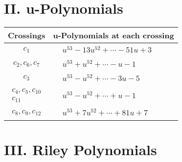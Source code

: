 \documentclass[1p]{elsarticle_modified}
\theoremstyle{definition}
\begin{document}
\newpage\renewcommand{\arraystretch}{1}
\centering \section*{ II. u-Polynomials}
\begin{tabular}{m{50pt}|m{274pt}}
Crossings & \hspace{64pt}u-Polynomials at each crossing \\
\hline $$\begin{aligned}c_{1}\end{aligned}$$&$\begin{aligned}
&u^{53}-13 u^{52}+\cdots-51 u+3
\end{aligned}$\\
\hline $$\begin{aligned}c_{2},c_{6},c_{7}\end{aligned}$$&$\begin{aligned}
&u^{53}+u^{52}+\cdots- u-1
\end{aligned}$\\
\hline $$\begin{aligned}c_{3}\end{aligned}$$&$\begin{aligned}
&u^{53}- u^{52}+\cdots-3 u-5
\end{aligned}$\\
\hline $$\begin{aligned}c_{4},c_{5},c_{10}\\c_{11}\end{aligned}$$&$\begin{aligned}
&u^{53}- u^{52}+\cdots+u-1
\end{aligned}$\\
\hline $$\begin{aligned}c_{8},c_{9},c_{12}\end{aligned}$$&$\begin{aligned}
&u^{53}+7 u^{52}+\cdots+81 u+7
\end{aligned}$\\
\hline
\end{tabular}\newpage\renewcommand{\arraystretch}{1}
\centering \section*{ III. Riley Polynomials}
\end{document}
